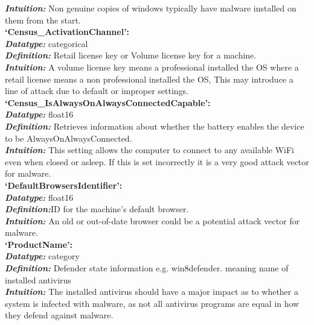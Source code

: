 \documentclass[sigconf]{acmart}
\begin{document}
\begin{center}
    \textbf{\textit{Intuition: }}Non genuine copies of windows typically have malware installed on them from the start.\\
    \vspace{5mm}
    \textbf{`Census\_ActivationChannel':\\}
    \textbf{\textit{Datatype: }}categorical\\
    \textbf{\textit{Definition: }}Retail license key or Volume license key for a machine. \\
    \textbf{\textit{Intuition: }}A volume license key means a professional installed the OS where a retail license means a non professional installed the OS, This may introduce a line of attack due to default or improper settings.\\
    \vspace{5mm}
    \textbf{`Census\_IsAlwaysOnAlwaysConnectedCapable':\\}
    \textbf{\textit{Datatype: }}float16\\
    \textbf{\textit{Definition: }}Retrieves information about whether the battery enables the device to be AlwaysOnAlwaysConnected. \\
    \textbf{\textit{Intuition: }}This setting allows the computer to connect to any available WiFi even when closed or asleep. If this is set incorrectly it is a very good attack vector for malware.\\
    \vspace{5mm}
    \textbf{`DefaultBrowsersIdentifier':\\}
    \textbf{\textit{Datatype: }}float16\\
    \textbf{\textit{Definition:}}ID for the machine’s default browser.\\
    \textbf{\textit{Intuition: }}An old or out-of-date browser could be a potential attack vector for malware.\\
    \vspace{5mm}
    \textbf{`ProductName':\\}
    \textbf{\textit{Datatype: }}category\\
    \textbf{\textit{Definition: }}Defender state information e.g.  win8defender. meaning name of installed antivirus\\
    \textbf{\textit{Intuition: }}The installed antivirus should have a major impact as to whether a system is infected with malware, as not all antivirus programs are equal in how they defend against malware.\\
    \vspace{5mm}

\end{center}
\end{document}
